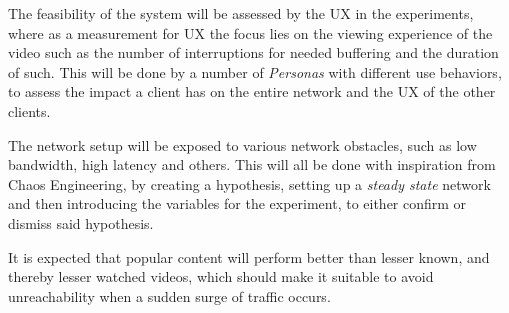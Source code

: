 The feasibility of the system will be assessed by the \ac{UX} in the experiments, where as a measurement for \ac{UX} the focus lies on the viewing experience of the video such as the number of interruptions for needed buffering and the duration of such. This will be done by a number of \emph{Personas} with different use behaviors, to assess the impact a client has on the entire network and the \ac{UX} of the other clients.


The network setup will be exposed to various network obstacles, such as low bandwidth, high latency and others. This will all be done with inspiration from Chaos Engineering, by creating a hypothesis, setting up a \emph{steady state} network and then introducing the variables for the experiment, to either confirm or dismiss said hypothesis.


It is expected that popular content will perform better than lesser known, and thereby lesser watched videos, which should make it suitable to avoid unreachability when a sudden surge of traffic occurs.


